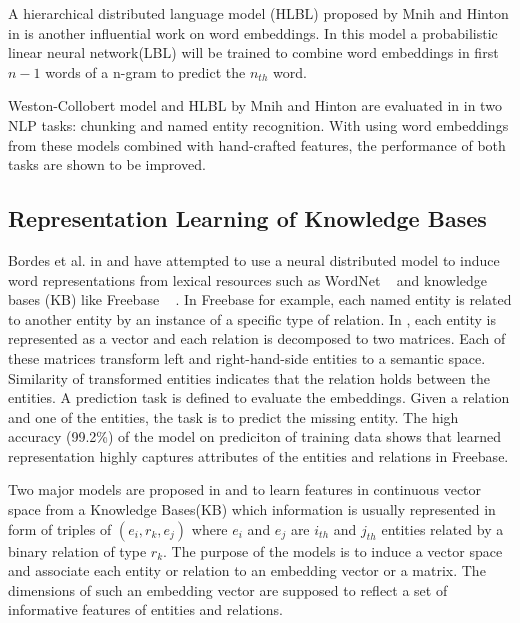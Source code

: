 A hierarchical distributed language model (HLBL) proposed by Mnih and
Hinton in \cite{Mnih2009} is another influential work on word embeddings. In
this model a probabilistic linear neural network(LBL) will be trained to 
combine word embeddings in first $n-1$ words of a n-gram to predict the $n_{th}$
word.

Weston-Collobert model and HLBL by Mnih and Hinton are evaluated in
\cite{Turian2010b} in two NLP tasks: chunking and named entity recognition. With
using word embeddings from these models combined with hand-crafted features, the
performance of both tasks are shown to be improved.
 
\subsection{Representation Learning of Knowledge Bases}
\label{sec: repr-learning-kb}
Bordes et al. in \cite{Bordes2011} and \cite{Bordes2012} have attempted to use
a neural distributed model to induce word representations from lexical resources
such as WordNet ~\cite{Fellbaum1998} and knowledge bases (KB) like Freebase
~\cite{Bollacker2008} .
In Freebase for example, each named entity is related to another entity by an instance of a specific type of relation. In
\cite{Bordes2011}, each entity is represented as a vector and each relation is decomposed to two
matrices. Each of these matrices transform left and right-hand-side entities
to a semantic space. Similarity of transformed entities indicates that the
relation holds between the entities.  A prediction task is defined to evaluate
the embeddings. Given a relation and one of the entities, the task is to predict
the missing entity. The high accuracy (99.2\%) of the model on prediciton
of training data shows that learned representation highly captures attributes of
the entities and relations in Freebase.

Two major models are proposed in \cite{Bordes2011} and \cite{Bordes2012} to
learn features in continuous  vector space from a Knowledge Bases(KB) which information is
usually represented in form of triples of $(e_{i},r_{k} , e_{j} )$ where $e_{i}$ and $e_{j}$ are $i_{th}$ and $j_{th}$ entities related
 by a binary relation of type $r_{k}$. The purpose of the models is to induce a vector space and associate
  each entity or relation to an embedding vector or a matrix.
  The dimensions of such an embedding vector are supposed to reflect a set of informative features of entities and relations.
   
